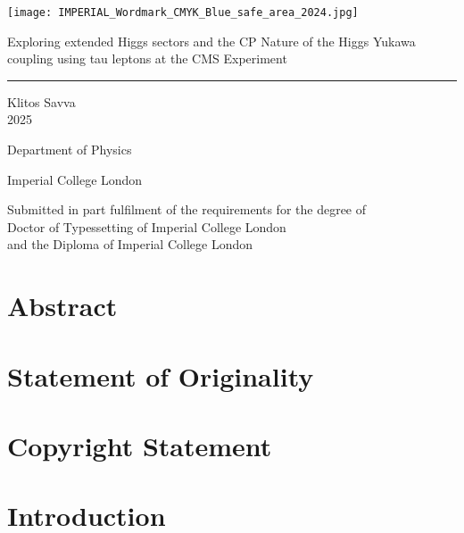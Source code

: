 \documentclass[12pt, a4paper, twoside]{report}
\begin{document}
\texttt{[image: IMPERIAL\_Wordmark\_CMYK\_Blue\_safe\_area\_2024.jpg]}
\vspace{5cm}
\begin{center}


{\huge Exploring extended Higgs sectors and the CP Nature of the Higgs Yukawa coupling using tau leptons at the CMS Experiment}
\rule{15cm}{1pt}
\vspace{2cm}

Klitos Savva\\
2025
\vspace{2cm}

Department of Physics

Imperial College London
\vspace{2cm}

Submitted in part fulfilment of the requirements for the degree of\\
Doctor of Typessetting of Imperial College London\\
and the Diploma of Imperial College London
\vfill
\clearpage
\end{center}

\chapter*{Abstract}
\blindtext

\chapter*{Statement of Originality}
\blindtext

\chapter*{Copyright Statement}
\blindtext





\tableofcontents
\listoffigures
\listoftables

%
\chapter*{Introduction }




\end{document}
